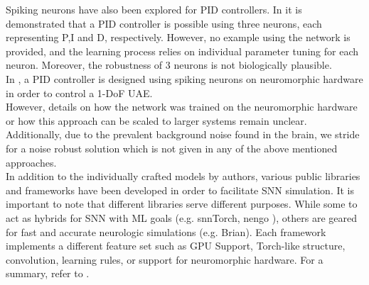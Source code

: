 Spiking neurons have also been explored for PID controllers. In \cite{lu_spiking_2011} it is demonstrated that a PID controller is possible using three neurons, each representing P,I and D, respectively. However, no example using the network is provided, and the learning process relies on individual parameter tuning for each neuron. Moreover, the robustness of 3 neurons is not biologically plausible.\\
In \cite{stagsted_towards_2020}, a PID controller is designed using spiking neurons on neuromorphic hardware in order to control a 1-DoF UAE.\\
However, details on how the network was trained on the neuromorphic hardware or how this approach can be scaled to larger systems remain unclear.\\
Additionally, due to the prevalent background noise found in the brain, we stride for a noise robust solution which is not given in any of the above mentioned approaches.\\
In addition to the individually crafted models by authors, various public libraries and frameworks have been developed in order to facilitate \ac{SNN} simulation. It is important to note that different libraries serve different purposes. While some to act as hybrids for \ac{SNN} with \ac{ML} goals (e.g. snnTorch\cite{eshraghian_training_2023}, nengo \cite{bekolay_nengo_2014}), others are geared for fast and accurate neurologic simulations (e.g. Brian\cite{stimberg_brian_2019}). Each framework implements a different feature set such as \ac{GPU} Support, Torch-like structure, convolution, learning rules, or support for neuromorphic hardware. For a summary, refer to  \cite{yamazaki_spiking_2022}.

